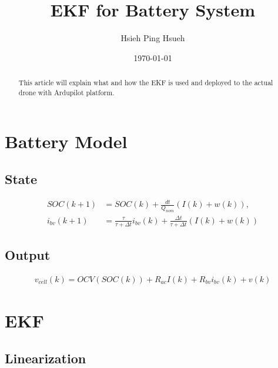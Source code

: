 \documentclass[11pt, a4paper]{article}
\title{\textbf{EKF for Battery System}}
\author{Hsieh Ping Hsueh}
\date{\today}
\theoremstyle{definition}
\theoremstyle{remark}
\begin{document}
\maketitle

\begin{abstract}
This article will explain what and how the EKF is used and deployed to the actual drone with Ardupilot platform.
\end{abstract}

\section{Battery Model}

\subsection{State}

\begin{align}
    SOC(k+1) &= SOC(k) + \frac{dt}{Q_{nom}}(I(k) + w(k)), \label{eq:orig_soc} \\
    i_{bv}(k+1) &= \frac{\tau}{\tau + \Delta t}i_{bv}(k) + \frac{\Delta t}{\tau + \Delta t} (I(k) + w(k)) \label{eq:orig_ibv}
\end{align}


\subsection{Output}

\begin{align}
    v_{cell}(k) = OCV(SOC(k)) + R_{ac}I(k) + R_{bv}i_{bv}(k) + v(k) \label{eq:orig_volt}
\end{align}

\section{EKF}

\subsection{Linearization}
\end{document}
